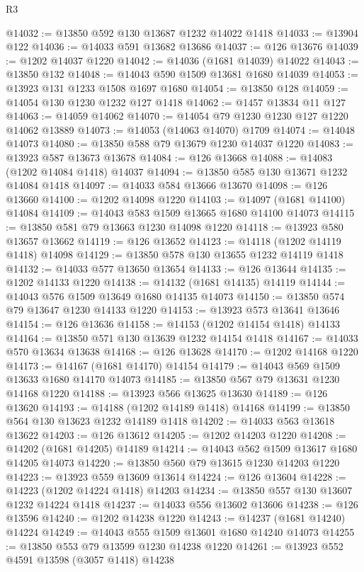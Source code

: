 \begin{lexlean}{R3}
\begin{coremodule}
@14032 := @13850 @592 @130 @13687 @1232 @14022 @1418
@14033 := @13904 @122
@14036 := @14033 @591 @13682 @13686
@14037 := @126 @13676
@14039 := @1202 @14037 @1220
@14042 := @14036 (@1681 @14039) @14022
@14043 := @13850 @132
@14048 := @14043 @590 @1509 @13681 @1680 @14039
@14053 := @13923 @131 @1233 @1508 @1697 @1680
@14054 := @13850 @128
@14059 := @14054 @130 @1230 @1232 @127 @1418
@14062 := @1457 @13834 @11 @127
@14063 := @14059 @14062
@14070 := @14054 @79 @1230 @1230 @127 @1220 @14062 @13889
@14073 := @14053 (@14063 @14070) @1709
@14074 := @14048 @14073
@14080 := @13850 @588 @79 @13679 @1230 @14037 @1220
@14083 := @13923 @587 @13673 @13678
@14084 := @126 @13668
@14088 := @14083 (@1202 @14084 @1418) @14037
@14094 := @13850 @585 @130 @13671 @1232 @14084 @1418
@14097 := @14033 @584 @13666 @13670
@14098 := @126 @13660
@14100 := @1202 @14098 @1220
@14103 := @14097 (@1681 @14100) @14084
@14109 := @14043 @583 @1509 @13665 @1680 @14100 @14073
@14115 := @13850 @581 @79 @13663 @1230 @14098 @1220
@14118 := @13923 @580 @13657 @13662
@14119 := @126 @13652
@14123 := @14118 (@1202 @14119 @1418) @14098
@14129 := @13850 @578 @130 @13655 @1232 @14119 @1418
@14132 := @14033 @577 @13650 @13654
@14133 := @126 @13644
@14135 := @1202 @14133 @1220
@14138 := @14132 (@1681 @14135) @14119
@14144 := @14043 @576 @1509 @13649 @1680 @14135 @14073
@14150 := @13850 @574 @79 @13647 @1230 @14133 @1220
@14153 := @13923 @573 @13641 @13646
@14154 := @126 @13636
@14158 := @14153 (@1202 @14154 @1418) @14133
@14164 := @13850 @571 @130 @13639 @1232 @14154 @1418
@14167 := @14033 @570 @13634 @13638
@14168 := @126 @13628
@14170 := @1202 @14168 @1220
@14173 := @14167 (@1681 @14170) @14154
@14179 := @14043 @569 @1509 @13633 @1680 @14170 @14073
@14185 := @13850 @567 @79 @13631 @1230 @14168 @1220
@14188 := @13923 @566 @13625 @13630
@14189 := @126 @13620
@14193 := @14188 (@1202 @14189 @1418) @14168
@14199 := @13850 @564 @130 @13623 @1232 @14189 @1418
@14202 := @14033 @563 @13618 @13622
@14203 := @126 @13612
@14205 := @1202 @14203 @1220
@14208 := @14202 (@1681 @14205) @14189
@14214 := @14043 @562 @1509 @13617 @1680 @14205 @14073
@14220 := @13850 @560 @79 @13615 @1230 @14203 @1220
@14223 := @13923 @559 @13609 @13614
@14224 := @126 @13604
@14228 := @14223 (@1202 @14224 @1418) @14203
@14234 := @13850 @557 @130 @13607 @1232 @14224 @1418
@14237 := @14033 @556 @13602 @13606
@14238 := @126 @13596
@14240 := @1202 @14238 @1220
@14243 := @14237 (@1681 @14240) @14224
@14249 := @14043 @555 @1509 @13601 @1680 @14240 @14073
@14255 := @13850 @553 @79 @13599 @1230 @14238 @1220
@14261 := @13923 @552 @4591 @13598 (@3057 @1418) @14238

\end{coremodule}
\end{lexlean}
